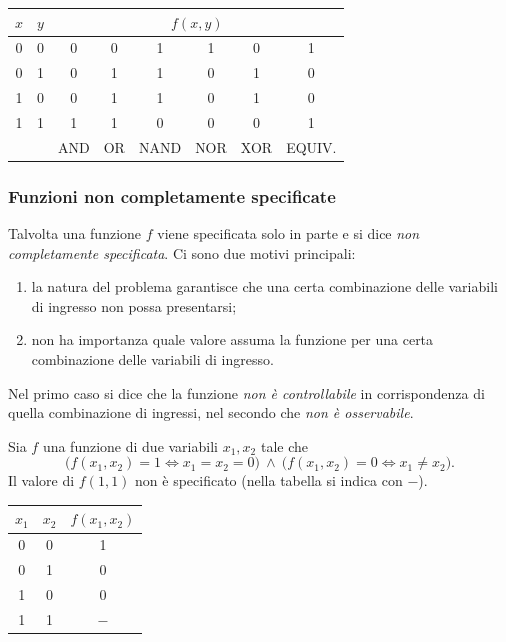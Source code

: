 \documentclass[11pt,a4paper]{article}
\begin{document}
\begin{esempio}
\begin{center}
\small
\begin{tabular}{cc|cccccc}
$x$ & $y$ & \multicolumn{6}{c}{$f(x,y)$} \\ \midrule
0 & 0 & 0 & 0 & 1 & 1 & 0 & 1 \\
0 & 1 & 0 & 1 & 1 & 0 & 1 & 0 \\
1 & 0 & 0 & 1 & 1 & 0 & 1 & 0 \\
1 & 1 & 1 & 1 & 0 & 0 & 0 & 1 \\ \midrule
\multicolumn{2}{c|}{}
  & \footnotesize AND & \footnotesize OR & \footnotesize NAND
  & \footnotesize NOR & \footnotesize XOR & \footnotesize EQUIV.
\end{tabular}
\end{center}
\end{esempio}

\subsubsection{Funzioni non completamente specificate}

Talvolta una funzione $f$ viene specificata solo in parte e si dice
\emph{non completamente specificata}. Ci sono due motivi principali:
\begin{enumerate}
    \item la natura del problema garantisce che una certa combinazione delle
          variabili di ingresso non possa presentarsi;
    \item non ha importanza quale valore assuma la funzione per una certa
          combinazione delle variabili di ingresso.
\end{enumerate}
Nel primo caso si dice che la funzione \emph{non è controllabile} in
corrispondenza di quella combinazione di ingressi, nel secondo che
\emph{non è osservabile}.

\begin{esempio}
Sia $f$ una funzione di due variabili $x_1, x_2$ tale che
\[
  \bigl(f(x_1,x_2) = 1 \iff x_1 = x_2 = 0\bigr) \ \wedge\
  \bigl(f(x_1,x_2) = 0 \iff x_1 \neq x_2\bigr).
\]
Il valore di $f(1,1)$ non è specificato (nella tabella si indica con $-$).
\begin{center}
\begin{tabular}{cc|c}
$x_1$ & $x_2$ & $f(x_1,x_2)$ \\ \midrule
0 & 0 & 1 \\
0 & 1 & 0 \\
1 & 0 & 0 \\
1 & 1 & $-$
\end{tabular}
\end{center}
\end{esempio}
\end{document}
